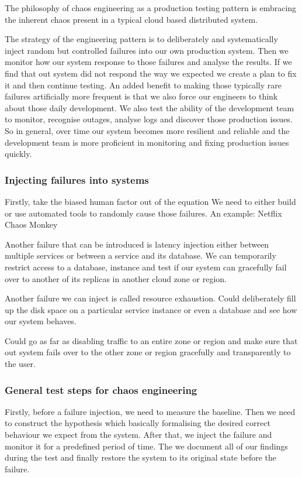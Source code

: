 \documentclass[a4paper, 11pt]{book}
\begin{document}
    The philosophy of chaos engineering as a production testing pattern is embracing the inherent chaos present in a typical cloud based distributed system.

    The strategy of the engineering pattern is to deliberately and systematically inject random but controlled failures into our own production system.
    Then we monitor how our system response to those failures and analyse the results.
    If we find that out system did not respond the way we expected we create a plan to fix it and then continue testing.
    An added benefit to making those typically rare failures artificially more frequent is that we also force our engineers to think about those daily development.
    We also test the ability of the development team to monitor, recognise outages, analyse logs and discover those production issues.
    So in general, over time our system becomes more resilient and reliable and the development team is more proficient in monitoring and fixing production issues quickly.

    \subsubsection{Injecting failures into systems}
    Firstly, take the biased human factor out of the equation
    We need to either build or use automated tools to randomly cause those failures.
    An example: Netflix Chaos Monkey

    Another failure that can be introduced is latency injection either between multiple services or between a service and its database.
    We can temporarily restrict access to a database, instance and test if our system can gracefully fail over to another of its replicas in another cloud zone or region.

    Another failure we can inject is called resource exhaustion.
    Could deliberately fill up the disk space on a particular service instance or even a database and see how our system behaves.

    Could go as far as disabling traffic to an entire zone or region and make sure that out system fails over to the other zone or region gracefully and transparently to the user.

    \subsubsection{General test steps for chaos engineering}
    Firstly, before a failure injection, we need to measure the baseline.
    Then we need to construct the hypothesis which basically formalising the desired correct behaviour we expect from the system.
    After that, we inject the failure and monitor it for a predefined period of time.
    The we document all of our findings during the test and finally restore the system to its original state before the failure.
\end{document}
